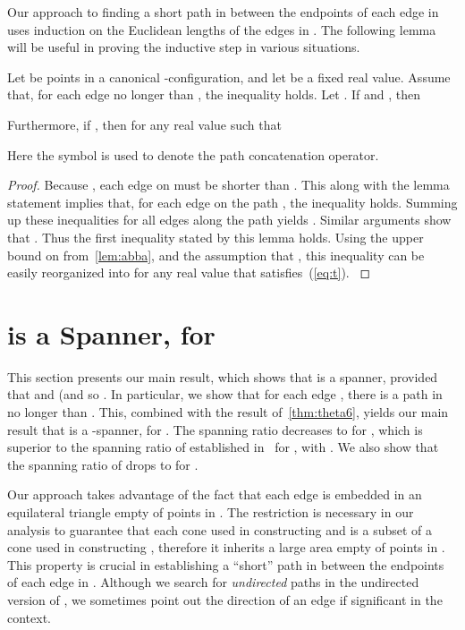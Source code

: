 \documentclass[runningheads,a4paper]{llncs}
\newcommand{\ABox}{
\raisebox{3pt}{\framebox[6pt]{\rule{6pt}{0pt}}}
}
\begin{document}
Our approach to finding a short path in  between the endpoints of each edge in  uses induction on the Euclidean lengths of the edges in . The following lemma will be useful in proving the inductive step in various situations. 

\begin{lemma}
\label{lem:pab}
Let  be points in a canonical -configuration, and let  be a fixed real value.  Assume that, for each edge  no longer than , the inequality  holds. 
Let . 
If  and , then 

Furthermore, if , then 
  for any real value  such that 

Here the symbol  is used to denote the path concatenation operator. 
\end{lemma}
\begin{proof}
Because , each edge on  must be shorter than . This along with the lemma statement implies that, for each edge  on the path , the inequality  holds. Summing up these inequalities for all edges along the path  yields .  Similar arguments show that . Thus the 
first inequality stated by this lemma holds. 
Using the upper bound on  from~\autoref{lem:abba}, and the assumption that 
, this inequality can be easily reorganized into  for any real value  that satisfies~(\ref{eq:t}).
{\hfill\ABox}\end{proof}

\section{ is a Spanner, for }
\label{sec:main}
This section presents our main result, which shows that  is a spanner, provided that  and  (and so . In particular, we show that for each edge , there is a path in  no longer than . This, combined with the result of~\autoref{thm:theta6}, yields our main result that  is a -spanner, for . The spanning ratio decreases to  for ,  which is superior to the spanning ratio of  established in~\cite{jDR12} for , with . We also show that the spanning ratio of  drops to  for . 

Our approach takes advantage of the fact that each edge  is embedded in an equilateral triangle  empty of points in . The restriction  is necessary in our analysis to guarantee that each cone used in constructing  and  is a subset of a cone used in constructing , therefore it inherits a large area empty of 
points in . This property is crucial in establishing a ``short'' path in  between the endpoints of each edge in . Although we search for \emph{undirected} paths in the undirected version of , we sometimes point out the direction of an edge if significant in the context. 
\end{document}
